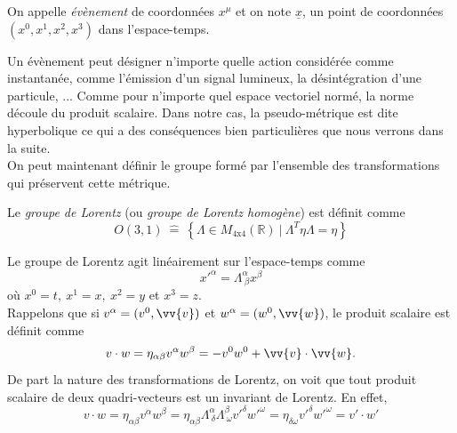 \documentclass[a4paper,11pt]{report}
\begin{document}
            \begin{defn}
                On appelle \textit{évènement} de coordonnées $x^\mu$ et on note $\underline{x}$, un point de coordonnées $(x^0,x^1,x^2,x^3)$ dans l'espace-temps.
            \end{defn}
            
            Un évènement peut désigner n'importe quelle action considérée comme instantanée, comme l'émission d'un signal lumineux, la désintégration d'une particule, ... Comme pour n'importe quel espace vectoriel normé, la norme découle du produit scalaire. Dans notre cas, la pseudo-métrique est dite hyperbolique ce qui a des conséquences bien particulières que nous verrons dans la suite.\\
            
            On peut maintenant définir le groupe formé par l'ensemble des transformations qui préservent cette métrique.
            \begin{defn}
                Le \textit{groupe de Lorentz} (ou \textit{groupe de Lorentz homogène}) est définit comme
                $$O(3,1)~\hat{=}~\left\{\Lambda\in M_{4\text{x}4}(\mathbb{R})~\big|~\Lambda^T\eta\Lambda = \eta\right\}$$
            \end{defn}
            
            Le groupe de Lorentz agit linéairement sur l'espace-temps comme
            \begin{equation}
                x'^\alpha = \Lambda^\alpha_{~\beta}x^\beta
            \end{equation}
            où $x^0 = t, ~x^1 = x, ~x^2 = y$ et $x^3 = z$.\\
            Rappelons que si $v^\alpha = (v^0,\vv{v})$ et $w^\alpha = (w^0,\vv{w})$, le produit scalaire est définit comme
            \begin{equation}
                v\cdot w = \eta_{\alpha\beta}v^\alpha w^\beta = -v^0w^0+\vv{v}\cdot\vv{w}.
            \end{equation}
            De part la nature des transformations de Lorentz, on voit que tout produit scalaire de deux quadri-vecteurs est un invariant de Lorentz. En effet, 
            \begin{equation}
                v\cdot w = \eta_{\alpha\beta}v^\alpha w^\beta = \eta_{\alpha\beta} \Lambda^\alpha_{~\delta}  \Lambda^\beta_{~\omega} v'^\delta w'^\omega = \eta_{\delta\omega}  v'^\delta w'^\omega = v'\cdot w'
            \end{equation}
            
\end{document}
